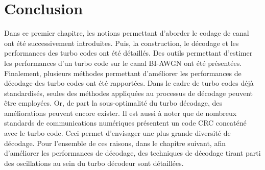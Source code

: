 \section{Conclusion}
Dans ce premier chapitre, les notions permettant d'aborder le codage de canal ont été successivement introduites. Puis, la 
construction, le décodage et les performances des turbo codes ont été détaillés. Des outils permettant d'estimer les 
performances d'un turbo code sur le canal BI-AWGN ont été présentées. Finalement, plusieurs méthodes permettant d'améliorer 
les performances de décodage des turbo codes ont été rapportées. Dans le cadre de turbo codes déjà standardisés, seules 
des méthodes appliquées au processus de décodage peuvent être employées. Or, de part la sous-optimalité du turbo décodage, des améliorations peuvent encore exister. Il est aussi à noter que de nombreux standards de communications numériques 
présentent un code CRC concaténé avec le turbo code. Ceci permet d'envisager une plus grande diversité de décodage. Pour 
l'ensemble de ces raisons, dans le chapitre suivant, afin d'améliorer les performances de décodage, des techniques de 
décodage tirant parti des oscillations au sein du turbo décodeur sont détaillées. 